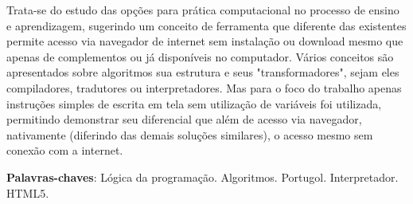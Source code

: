 

\begin{resumo}
Trata-se do estudo das opções para prática computacional no processo de ensino e aprendizagem, sugerindo um conceito de ferramenta que diferente das existentes permite acesso via navegador de internet sem instalação ou download mesmo que apenas de complementos ou já disponíveis no computador. Vários conceitos são apresentados sobre algoritmos sua estrutura e seus "transformadores", sejam eles compiladores, tradutores ou interpretadores. Mas para o foco do trabalho apenas instruções simples de escrita em tela sem utilização de variáveis foi utilizada, permitindo demonstrar seu diferencial que além de acesso via navegador, nativamente (diferindo das demais soluções similares), o acesso mesmo sem conexão com a internet.

\vspace{\onelineskip}
\textbf{Palavras-chaves}: Lógica da programação. Algoritmos. Portugol. Interpretador. HTML5.
\end{resumo}

%
